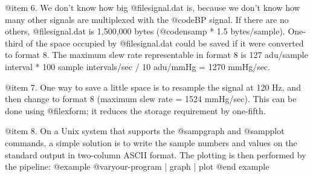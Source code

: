 {{{{{{{{{@item 6.
We don't know how big @file{signal.dat} is, because we don't know how
many other signals are multiplexed with the @code{BP} signal.  If there
are no others, @file{signal.dat} is 1,500,000 bytes (@code{nsamp} * 1.5
bytes/sample).  One-third of the space occupied by @file{signal.dat} could be
saved if it were converted to format 8.  The maximum slew rate
representable in format 8 is 127 adu/sample interval * 100 sample
intervals/sec / 10 adu/mmHg = 1270 mmHg/sec.

@item 7.
One way to save a little space is to resample the signal at 120 Hz, and
then change to format 8 (maximum slew rate = 1524 mmHg/sec).  This can be
done using @file{xform};  it reduces the storage requirement by
one-fifth.

@item 8.
On a Unix system that supports the @samp{graph} and @samp{plot}
commands, a simple solution is to write the sample numbers and values on
the standard output in two-column ASCII format.  The plotting is then
performed by the pipeline:
@example
@var{your-program} | graph | plot
@end example

}}}}}}}}}

